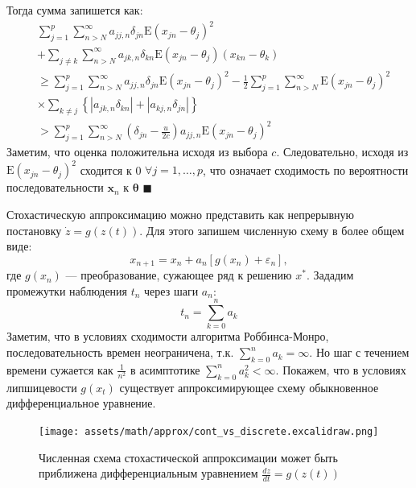 Тогда сумма запишется как:
\begin{equation}
    \begin{aligned}
        & \sum_{j=1}^{p} \sum_{n>N}^{\infty} a_{j j, n} \delta_{j n} \mathrm{E}\left(x_{j n}-\theta_{j}\right)^{2} \\
        & +\sum_{j \neq k} \sum_{n>N}^{\infty} a_{j k, n} \delta_{k n} \mathrm{E}\left(x_{j n}-\theta_{j}\right)\left(x_{k n}-\theta_{k}\right) \\
        &  \geq \sum_{j=1}^{p} \sum_{n>N}^{\infty} a_{j j, n} \delta_{j n} \mathrm{E}\left(x_{j n}-\theta_{j}\right)^{2}-\frac{1}{2} \sum_{j=1}^{p} \sum_{n>N}^{\infty} \mathrm{E}\left(x_{j n}-\theta_{j}\right)^{2} \\
        &  \times \sum_{k \neq j}\left\{\left|a_{j k, n} \delta_{k n}\right|+\left|a_{k j, n} \delta_{j n}\right|\right\} \\
        & >\sum_{j=1}^{p} \sum_{n>N}^{\infty}\left(\delta_{j n}-\frac{u}{2 c}\right) a_{j j, n} \mathrm{E}\left(x_{j n}-\theta_{j}\right)^{2}
    \end{aligned}
\end{equation}
Заметим, что оценка положительна исходя из выбора $c$. Следовательно, исходя из $\mathrm{E}\left(x_{j n}-\theta_{j}\right)^{2}$ сходится к 0 $\forall j= 1, \ldots, p$,
что означает сходимость по вероятности последовательности $\mathbf{x}_{n}$ к $\boldsymbol{\theta}$
$\blacksquare$

Стохастическую аппроксимацию можно представить
как непрерывную постановку $\dot{z} = g(z(t))$. Для этого запишем численную схему в более общем виде:
\begin{equation}
    x_{n+1} = x_n + a_n \left[g(x_n) + \varepsilon_n \right],
\end{equation}
где $g(x_n)$ --- преобразование, сужающее ряд к решению $x^*$. Зададим промежутки наблюдения $t_n$ через шаги $a_n$:
\begin{equation}
    t_n = \sum_{k=0}^n a_k 
\end{equation}
Заметим, что в условиях сходимости алгоритма Роббинса-Монро, последовательность времен неограничена, 
т.к. $\sum_{k=0}^n a_k =\infty$.
Но шаг с течением времени сужается как $\frac{1}{n^2}$ в асимптотике $\sum_{k=0}^n a^2_k < \infty$. 
Покажем, что в условиях липшицевости $g(x_t)$ существует аппроксимирующее схему обыкновенное дифференциальное уравнение.

\begin{figure}[h]
    \centering
    \texttt{[image: assets/math/approx/cont\_vs\_discrete.excalidraw.png]}
    \caption{Численная схема стохастической аппроксимации может быть приближена дифференциальным уравнением $\frac{d z}{d t} = g(z(t))$ }
    \label{continuiation}
\end{figure}

